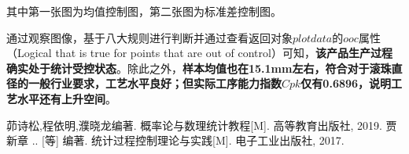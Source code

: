 \documentclass[12pt]{article}  %
\begin{document}
其中第一张图为均值控制图，第二张图为标准差控制图。

通过观察图像，基于八大规则进行判断并通过查看返回对象$plotdata$的$ooc$属性（Logical that is true for points that are out of control）可知，\textbf{该产品生产过程确实处于统计受控状态}。除此之外，\textbf{样本均值也在15.1mm左右，符合对于滚珠直径的一般行业要求，工艺水平良好；但实际工序能力指数$Cpk$仅有0.6896，说明工艺水平还有上升空间}。

\begin{thebibliography}{99}
	 茆诗松,程依明,濮晓龙编著. 概率论与数理统计教程[M]. 高等教育出版社, 2019.
	 贾新章 .. [等] 编著. 统计过程控制理论与实践[M]. 电子工业出版社, 2017.
\end{thebibliography}
\end{document}
